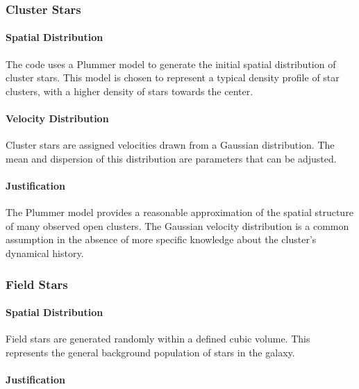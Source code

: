 \documentclass{article}
\begin{document}
	\subsubsection{Cluster Stars}
	
	\paragraph{Spatial Distribution}
	
	The code uses a Plummer model to generate the initial spatial distribution of cluster stars. This model is chosen to represent a typical density profile of star clusters, with a higher density of stars towards the center.
	
	\paragraph{Velocity Distribution}
	
	Cluster stars are assigned velocities drawn from a Gaussian distribution. The mean and dispersion of this distribution are parameters that can be adjusted. 
	
	\paragraph{Justification}
	
	The Plummer model provides a reasonable approximation of the spatial structure of many observed open clusters. The Gaussian velocity distribution is a common assumption in the absence of more specific knowledge about the cluster's dynamical history.
	
	\subsubsection{Field Stars}
	
	\paragraph{Spatial Distribution}
	
	Field stars are generated randomly within a defined cubic volume. This represents the general background population of stars in the galaxy.
	
	
	
	\paragraph{Justification}
	
\end{document}
